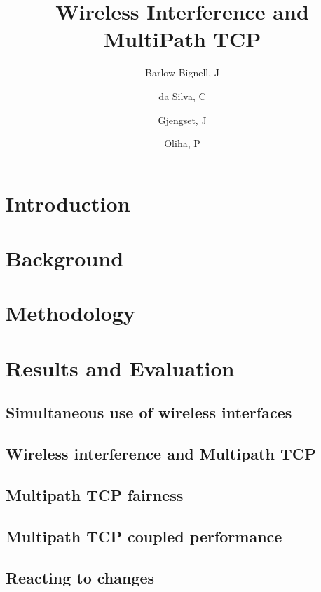 \documentclass[12pt,a4paper]{article}
\title{Wireless Interference and MultiPath TCP}
\author{Barlow-Bignell, J}
\author{da Silva, C}
\author{Gjengset, J}
\author{Oliha, P}
\affil{University College London}
\date{}
\begin{document}
\maketitle

\begin{abstract}
 
\end{abstract}
\clearpage

\section{Introduction}

\FloatBarrier

\section{Background}

\FloatBarrier

\section{Methodology}

\FloatBarrier

\section{Results and Evaluation}

\subsection{Simultaneous use of wireless interfaces}
\label{sec:results-interference}

\FloatBarrier
\subsection{Wireless interference and Multipath TCP}
\label{sec:results-mptcp}

\FloatBarrier
\subsection{Multipath TCP fairness}
\label{sec:results-fairness}

\FloatBarrier
\subsection{Multipath TCP coupled performance}
\label{sec:results-performance}

\FloatBarrier
\subsection{Reacting to changes}
\label{sec:results-reacting}

\FloatBarrier
\end{document}
